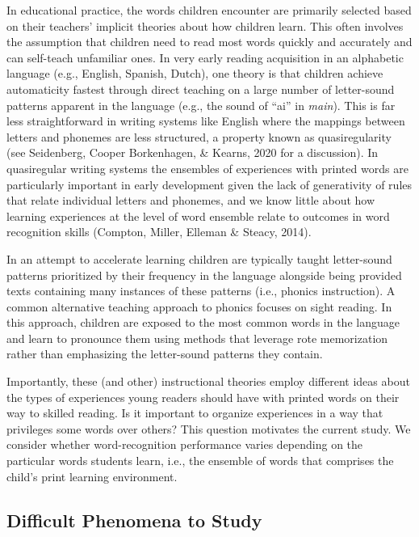\documentclass[
  ,man,floatsintext]{apa6}
\begin{document}
In educational practice, the words children encounter are primarily selected based on their teachers' implicit theories about how children learn. This often involves the assumption that children need to read most words quickly and accurately and can self-teach unfamiliar ones. In very early reading acquisition in an alphabetic language (e.g., English, Spanish, Dutch), one theory is that children achieve automaticity fastest through direct teaching on a large number of letter-sound patterns apparent in the language (e.g., the sound of ``ai'' in \emph{main}). This is far less straightforward in writing systems like English where the mappings between letters and phonemes are less structured, a property known as quasiregularity (see Seidenberg, Cooper Borkenhagen, \& Kearns, 2020 for a discussion). In quasiregular writing systems the ensembles of experiences with printed words are particularly important in early development given the lack of generativity of rules that relate individual letters and phonemes, and we know little about how learning experiences at the level of word ensemble relate to outcomes in word recognition skills (Compton, Miller, Elleman \& Steacy, 2014).

In an attempt to accelerate learning children are typically taught letter-sound patterns prioritized by their frequency in the language alongside being provided texts containing many instances of these patterns (i.e., phonics instruction). A common alternative teaching approach to phonics focuses on sight reading. In this approach, children are exposed to the most common words in the language and learn to pronounce them using methods that leverage rote memorization rather than emphasizing the letter-sound patterns they contain.

Importantly, these (and other) instructional theories employ different ideas about the types of experiences young readers should have with printed words on their way to skilled reading. Is it important to organize experiences in a way that privileges some words over others? This question motivates the current study. We consider whether word-recognition performance varies depending on the particular words students learn, i.e., the ensemble of words that comprises the child's print learning environment.

\subsection{Difficult Phenomena to Study}\label{difficult-phenomena-to-study}
\end{document}
